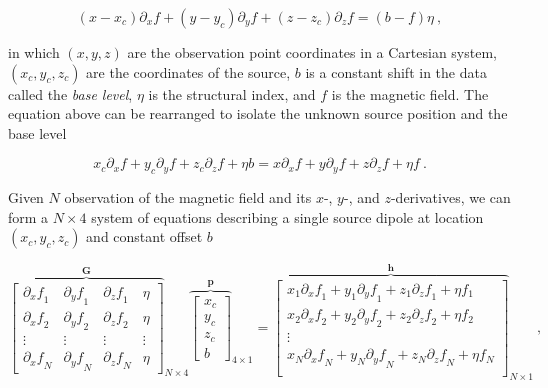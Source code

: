 \documentclass[onecolumn,12pt,a4paper]{article}
\begin{document}
        \begin{equation}
        \label{eq_euler_homogeneity}
        (x - x_c)\partial_x f
        + (y - y_c)\partial_y f
        + (z - z_c)\partial_z f
        = (b - f)\eta
        \ ,
        \end{equation}

    \noindent
    in which $(x, y, z)$ are the observation point coordinates in a Cartesian system, $(x_c, y_c, z_c)$ are the coordinates of the source, $b$ is a constant shift in the data called the \textit{base level}, $\eta$ is the structural index, and $f$ is the magnetic field.
    The equation above can be rearranged to isolate the unknown source position  and the base level 

    \begin{equation}
    x_c \partial_x f + y_c \partial_y f + z_c \partial_z f + \eta b
    =
    x \partial_x f + y \partial_y f + z \partial_z f + \eta f
    \ .
    \end{equation}

    Given $N$ observation of the magnetic field and its $x$-, $y$-, and $z$-derivatives, we can form a $N \times 4$ system of equations describing a single source dipole at location $(x_c,y_c,z_c)$ and constant offset $b$

    \begin{equation}
    {\overbrace{
    \begin{bmatrix}
      {\partial_x f}_1 & {\partial_y f}_1 & {\partial_z f}_1 & \eta \\
      {\partial_x f}_2 & {\partial_y f}_2 & {\partial_z f}_2 & \eta \\
      \vdots & \vdots & \vdots & \vdots \\
      {\partial_x f}_N & {\partial_y f}_N & {\partial_z f}_N & \eta
    \end{bmatrix}
    }^{\mathbf{G}}}_{N \times 4}
    {\overbrace{
    \begin{bmatrix}
      x_c \\ y_c \\ z_c \\ b
    \end{bmatrix}
    }^{\mathbf{p}}}_{4 \times 1}
    =
    {\overbrace{
    \begin{bmatrix}
      x_1 {\partial_x f}_1 + y_1 {\partial_y f}_1 + z_1 {\partial_z f}_1 + \eta f_1 \\
      x_2 {\partial_x f}_2 + y_2 {\partial_y f}_2 + z_2 {\partial_z f}_2 + \eta f_2 \\
      \vdots \\
      x_N {\partial_x f}_N + y_N {\partial_y f}_N + z_N {\partial_z f}_N + \eta f_N \\
    \end{bmatrix}
    }^{\mathbf{h}}}_{N \times 1}
    \ ,
    \end{equation}
\end{document}
